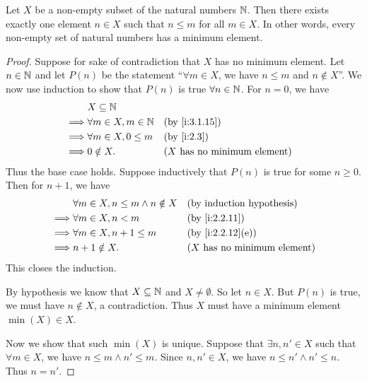 \begin{prop}\label{i:8.1.4}
  Let \(X\) be a non-empty subset of the natural numbers \(\mathbb{N}\).
  Then there exists exactly one element \(n \in X\) such that \(n \leq m\) for all \(m \in X\).
  In other words, every non-empty set of natural numbers has a minimum element.
\end{prop}

\begin{proof}
  Suppose for sake of contradiction that \(X\) has no minimum element.
  Let \(n \in \mathbb{N}\) and let \(P(n)\) be the statement ``\(\forall m \in X\), we have \(n \leq m\) and \(n \notin X\)''.
  We now use induction to show that \(P(n)\) is true \(\forall n \in \mathbb{N}\).
  For \(n = 0\), we have
  \begin{align*}
             & X \subseteq \N                                                       \\
    \implies & \forall m \in X, m \in \N &  & \by{i:3.1.15}                         \\
    \implies & \forall m \in X, 0 \leq m &  & \by{i:2.3}                            \\
    \implies & 0 \notin X.               &  & \text{(\(X\) has no minimum element)}
  \end{align*}
  Thus the base case holds.
  Suppose inductively that \(P(n)\) is true for some \(n \geq 0\).
  Then for \(n + 1\), we have
  \begin{align*}
             & \forall m \in X, n \leq m \land n \notin X &  & \byIH                                 \\
    \implies & \forall m \in X, n < m                     &  & \by{i:2.2.11}                         \\
    \implies & \forall m \in X, n + 1 \leq m              &  & \by{i:2.2.12}[e]                      \\
    \implies & n + 1 \notin X.                            &  & \text{(\(X\) has no minimum element)}
  \end{align*}
  This closes the induction.

  By hypothesis we know that \(X \subseteq \mathbb{N}\) and \(X \neq \emptyset\).
  So let \(n \in X\).
  But \(P(n)\) is true, we must have \(n \notin X\), a contradiction.
  Thus \(X\) must have a minimum element \(\min(X) \in X\).

  Now we show that such \(\min(X)\) is unique.
  Suppose that \(\exists n, n' \in X\) such that \(\forall m \in X\), we have \(n \leq m \land n' \leq m\).
  Since \(n, n' \in X\), we have \(n \leq n' \land n' \leq n\).
  Thus \(n = n'\).
\end{proof}

